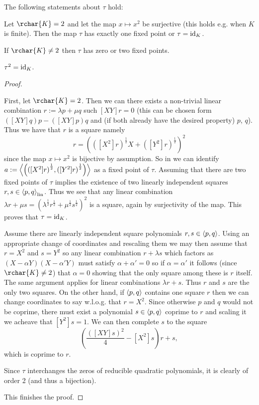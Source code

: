 \begin{lemma}
    The following statements about $\tau$ hold:
    \begin{statements}
            \item Let $\rchar{K}=2$ and let the  map $x\mapsto x^2$ be surjective (this holds e.g. when $K$ is finite). Then the map $\tau$ has exactly one fixed point or $\tau=\mathop\mathrm{id}\nolimits_K$.
            \item If $\rchar{K}\neq 2$ then $\tau$ has zero or two fixed points.
            \item $\tau^2=\mathop\mathrm{id}\nolimits_K$.
    \end{statements}
\end{lemma}

\begin{proof}
    \begin{statements}
        \item First, let $\rchar{K}=2$. Then we can there exists a non-trivial linear combination $r:=\lambda p +\mu q$ such $[XY]r=0$ (this can be chosen form $([XY]q) p-([XY]p) q$ and (if both already have the desired property) $p$, $q$). Thus we have that $r$ is a square namely
    $$r={\left({([X^2]r)}^{\frac{1}{2}}X+{([Y^2]r)}^{\frac{1}{2}}\right)}^2$$
    since the  map $x\mapsto x^2$ is bijective by assumption. So in we can identify $a:=\gen{\left({([X^2]r)}^{\frac{1}{2}},{([Y^2]r)}^{\frac{1}{2}}\right)}$ as a fixed point of $\tau$.
    Assuming that there are two fixed points of $\tau$ implies the existence of two linearly independent squares $r,s\in\gen[\lin]{p,q}$. Thus we see that any linear combination $\lambda r+\mu s={(\lambda^{\frac{1}{2}} r^{\frac{1}{2}}+\mu^{\frac{1}{2}} s^{\frac{1}{2}})}^2$ is a square, again by surjectivity of the  map. This proves that $\tau=\mathop\mathrm{id}\nolimits_K$.
        \item Assume there are linearly independent square polynomials $r,s\in\gen{p,q}$. Using an appropriate change of coordinates and rescaling them we may then assume that $r=X^2$ and $s=Y^2$ so any linear combination $r+\lambda s$ which factors as $(X-\alpha Y)(X-\alpha'Y)$ must satisfy $\alpha+\alpha'=0$ so if $\alpha=\alpha'$ it follows (since $\rchar{K}\neq 2$) that $\alpha=0$ showing that the only square among these is $r$ itself.
    The same argument applies for linear combinations $\lambda r+s$. Thus $r$ and $s$ are the only two squares.
    On the other hand, if $\gen{p,q}$ contains one square $r$ then we can change coordinates to say w.l.o.g. that $r=X^2$. Since otherwise $p$ and $q$ would not be coprime, there must exist a polynomial $s\in\gen{p,q}$ coprime to $r$ and scaling it we acheave that $[Y^2]s=1$. We can then complete $s$ to the square
    $$
    \left(\frac{{([XY]s)}^2}{4}-[X^2]s\right)r+s,
    $$
    which is coprime to $r$.
    \item Since $\tau$ interchanges the zeros of reducible quadratic polynomials, it is clearly of order 2 (and thus a bijection).
\end{statements}
This finishes the proof.
\end{proof}


